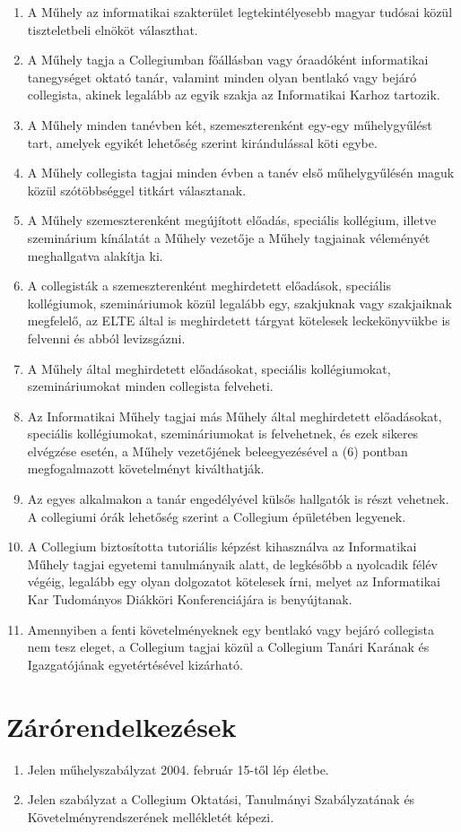 \documentclass{../styles/rulebook}
\begin{document}
\begin{enumerate}
	\item A Műhely az informatikai szakterület legtekintélyesebb magyar tudósai közül tiszteletbeli elnököt választhat.
	\item A Műhely tagja a Collegiumban főállásban vagy óraadóként informatikai tanegységet oktató tanár, valamint minden olyan bentlakó vagy bejáró collegista, akinek legalább az egyik szakja az Informatikai Karhoz tartozik. 
	\item A Műhely minden tanévben két, szemeszterenként egy-egy műhelygyűlést tart, amelyek egyikét lehetőség szerint kirándulással köti egybe.
	\item A Műhely collegista tagjai minden évben a tanév első műhelygyűlésén maguk közül szótöbbséggel titkárt választanak.
	\item A Műhely szemeszterenként megújított előadás, speciális kollégium, illetve szeminárium kínálatát a Műhely vezetője a Műhely tagjainak véleményét meghallgatva alakítja ki.
	\item A collegisták a szemeszterenként meghirdetett előadások, speciális kollégiumok, szemináriumok közül legalább egy, szakjuknak vagy szakjaiknak megfelelő, az ELTE által is meghirdetett tárgyat kötelesek leckekönyvükbe is felvenni és abból levizsgázni. 
	\item A Műhely által meghirdetett előadásokat, speciális kollégiumokat, szemináriumokat minden collegista felveheti. 
	\item Az Informatikai Műhely tagjai más Műhely által meghirdetett előadásokat, speciális kollégiumokat, szemináriumokat is felvehetnek, és ezek sikeres elvégzése esetén, a Műhely vezetőjének beleegyezésével a (6) pontban megfogalmazott követelményt kiválthatják.
	\item Az egyes alkalmakon a tanár engedélyével külsős hallgatók is részt vehetnek. A collegiumi órák lehetőség szerint a Collegium épületében legyenek.
	\item A Collegium biztosította tutoriális képzést kihasználva az Informatikai Műhely tagjai egyetemi tanulmányaik alatt, de legkésőbb a nyolcadik félév végéig, legalább egy olyan dolgozatot kötelesek írni, melyet az Informatikai Kar Tudományos Diákköri Konferenciájára is benyújtanak.
	\item Amennyiben a fenti követelményeknek egy bentlakó vagy bejáró collegista nem tesz eleget, a Collegium tagjai közül a Collegium Tanári Karának és Igazgatójának egyetértésével kizárható.
\end{enumerate}


\section{Zárórendelkezések}

\begin{enumerate}
	\item Jelen műhelyszabályzat 2004. február 15-től lép életbe.
	\item Jelen szabályzat a Collegium Oktatási, Tanulmányi Szabályzatának és Követelményrendszerének mellékletét képezi.
\end{enumerate}
\end{document}
